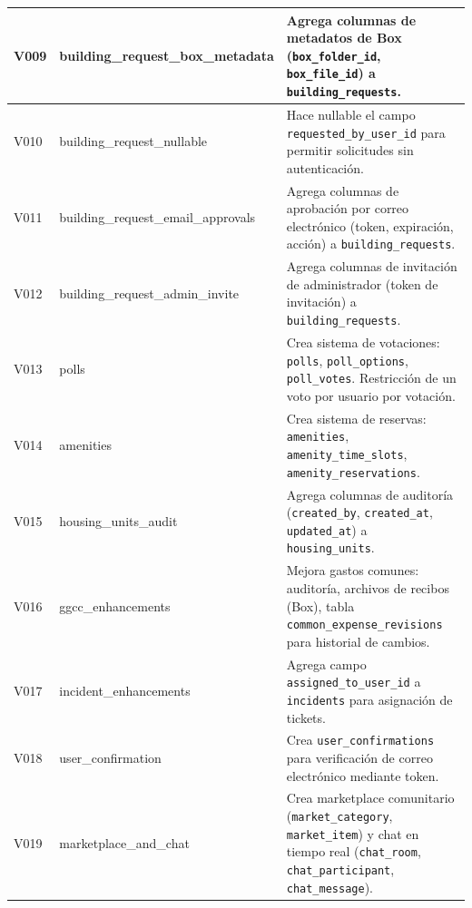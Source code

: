 \begin{longtable}{|p{}|p{}|p{}|}
V009 & building\_request\_box\_metadata & Agrega columnas de metadatos de Box (\texttt{box\_folder\_id}, \texttt{box\_file\_id}) a \texttt{building\_requests}. \\ \hline

V010 & building\_request\_nullable & Hace nullable el campo \texttt{requested\_by\_user\_id} para permitir solicitudes sin autenticación. \\ \hline

V011 & building\_request\_email\_approvals & Agrega columnas de aprobación por correo electrónico (token, expiración, acción) a \texttt{building\_requests}. \\ \hline

V012 & building\_request\_admin\_invite & Agrega columnas de invitación de administrador (token de invitación) a \texttt{building\_requests}. \\ \hline

V013 & polls & Crea sistema de votaciones: \texttt{polls}, \texttt{poll\_options}, \texttt{poll\_votes}. Restricción de un voto por usuario por votación. \\ \hline

V014 & amenities & Crea sistema de reservas: \texttt{amenities}, \texttt{amenity\_time\_slots}, \texttt{amenity\_reservations}. \\ \hline

V015 & housing\_units\_audit & Agrega columnas de auditoría (\texttt{created\_by}, \texttt{created\_at}, \texttt{updated\_at}) a \texttt{housing\_units}. \\ \hline

V016 & ggcc\_enhancements & Mejora gastos comunes: auditoría, archivos de recibos (Box), tabla \texttt{common\_expense\_revisions} para historial de cambios. \\ \hline

V017 & incident\_enhancements & Agrega campo \texttt{assigned\_to\_user\_id} a \texttt{incidents} para asignación de tickets. \\ \hline

V018 & user\_confirmation & Crea \texttt{user\_confirmations} para verificación de correo electrónico mediante token. \\ \hline

V019 & marketplace\_and\_chat & Crea marketplace comunitario (\texttt{market\_category}, \texttt{market\_item}) y chat en tiempo real (\texttt{chat\_room}, \texttt{chat\_participant}, \texttt{chat\_message}). \\ \hline


\end{longtable}
